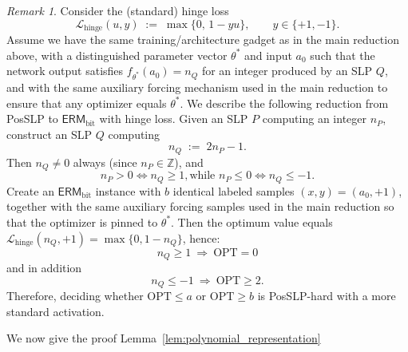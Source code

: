 \documentclass{article}
\theoremstyle{plain}
\theoremstyle{definition}
\theoremstyle{remark}
\newtheorem{remark}[theorem]{Remark}
\begin{document}
\begin{remark}
\label{rem:hinge-posslp}
Consider the (standard) hinge loss
\[
\mathcal{L}_{\mathrm{hinge}}(u,y)\;:=\;\max\{0,\,1-yu\},
\qquad y\in\{+1,-1\}.
\]
Assume we have the same training/architecture gadget as in the main reduction above,
with a distinguished parameter vector $\theta^*$ and input $a_0$ such that
the network output satisfies $f_{\theta^*}(a_0)=n_Q$ for an integer produced by an SLP $Q$,
and with the same auxiliary forcing mechanism used in the main reduction to ensure
that any optimizer equals $\theta^*$. We describe the following reduction from PosSLP to $\mathsf{ERM}_{\text{bit}}$ with hinge loss.
Given an SLP $P$ computing an integer $n_P$, construct an SLP $Q$ computing
\[
n_Q \;:=\; 2n_P-1.
\]
Then $n_Q\neq 0$ always (since $n_P\in\mathbb{Z}$), and
\[
n_P>0 \iff n_Q\ge 1,
\text{while }
n_P\le 0 \iff n_Q\le -1.
\]
Create an $\mathsf{ERM}_{\text{bit}}$ instance with $b$ identical labeled samples
$(x,y)=(a_0,+1)$, together with the same auxiliary forcing samples used in the
main reduction so that the optimizer is pinned to $\theta^*$.
Then
the optimum value equals $\mathcal{L}_{\mathrm{hinge}}(n_Q,+1)=\max\{0,1-n_Q\}$, hence:
\[
n_Q\ge 1 \ \Rightarrow\ \mathrm{OPT}=0
\]
and in addition
\[
n_Q\le -1 \ \Rightarrow\ \mathrm{OPT}\ge 2.
\]
Therefore, deciding whether $\mathrm{OPT}\le a$ or $\mathrm{OPT}\ge b$ is \textsf{PosSLP}-hard with a more standard activation. 
\end{remark}



We now give the proof Lemma~\ref{lem:polynomial_representation}
\end{document}
